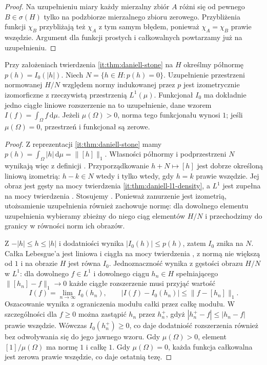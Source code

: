 \begin{proof}
Na uzupełnieniu miary każdy mierzalny zbiór $A$
różni się od pewnego $B\in\sigma(H)$ tylko na podzbiorze
mierzalnego zbioru zerowego. Przybliżenia funkcji
$\chi_B$ przybliżają też $\chi_A$ z tym samym błędem,
ponieważ $\chi_A=\chi_B$ prawie wszędzie. Argument dla funkcji prostych
i całkowalnych powtarzamy już na uzupełnieniu.
\end{proof}

\begin{wniosek}
\label{it:cor:daniell-continuous-extension}
Przy założeniach twierdzenia \ref{it:thm:daniell-stone}
na $H$ określmy półnormę $p(h)=I_0(|h|)$.
Niech $N=\{h\in H:p(h)=0\}$. Uzupełnienie przestrzeni
normowanej $H/N$ względem normy indukowanej przez $p$
jest izometrycznie izomorficzne z rzeczywistą
przestrzenią $L^1(\mu)$.
Funkcjonał $I_0$ ma dokładnie jedno ciągłe liniowe
rozszerzenie na to uzupełnienie, dane wzorem
$I(f)=\int_\Omega f\,\mathrm d\mu$.
Jeżeli $\mu(\Omega)>0$, norma tego funkcjonału wynosi $1$;
jeśli $\mu(\Omega)=0$, przestrzeń i funkcjonał są zerowe.
\end{wniosek}
\begin{proof}
Z reprezentacji \ref{it:thm:daniell-stone} mamy
$p(h)=\int_\Omega |h|\,\mathrm d\mu=\|[h]\|_1$.
Własności półnormy i podprzestrzeni $N$ wynikają więc
z definicji . Przyporządkowanie
$h+N\mapsto[h]$ jest dobrze określoną liniową izometrią:
$h-k\in N$ wtedy i tylko wtedy, gdy $h=k$ prawie
wszędzie. Jej obraz jest gęsty na mocy twierdzenia
\ref{it:thm:daniell-l1-density}, a $L^1$ jest zupełna na mocy twierdzenia
.
Stosujemy
.
Ponieważ zanurzenie jest izometrią, utożsamienie
uzupełnienia również zachowuje normę: dla dowolnego
elementu uzupełnienia wybieramy zbieżny do niego
ciąg elementów $H/N$ i przechodzimy do granicy
w równości norm ich obrazów.

Z $- |h|\le h\le|h|$ i dodatniości wynika
$|I_0(h)|\le p(h)$, zatem $I_0$ znika na $N$.
Całka Lebesgue'a jest liniowa i ciągła na mocy
twierdzenia , z normą
nie większą od $1$ i na obrazie $H$ jest równa $I_0$.
Jednoznaczność wynika z gęstości obrazu $H/N$
w $L^1$: dla dowolnego $f\in L^1$ i dowolnego ciągu
$h_n\in H$ spełniającego $\|[h_n]-f\|_1\to0$
każde ciągłe rozszerzenie musi przyjąć wartość
\[
 I(f)=\lim_{n\to\infty}I_0(h_n),
 \qquad
 |I(f)-I_0(h_n)|\le\|f-[h_n]\|_1.
\]
Oszacowanie wynika z ograniczenia modułu całki
przez całkę modułu. W szczególności dla $f\ge0$
można zastąpić $h_n$ przez $h_n^+$, gdyż
$|h_n^+-f|\le |h_n-f|$ prawie wszędzie.
Wówczas $I_0(h_n^+)\ge0$, co daje dodatniość
rozszerzenia również bez odwoływania się do jego
jawnego wzoru.
Gdy $\mu(\Omega)>0$, element
$[1]/\mu(\Omega)$ ma normę $1$ i całkę $1$.
Gdy $\mu(\Omega)=0$, każda funkcja całkowalna
jest zerowa prawie wszędzie, co daje ostatnią tezę.
\end{proof}

